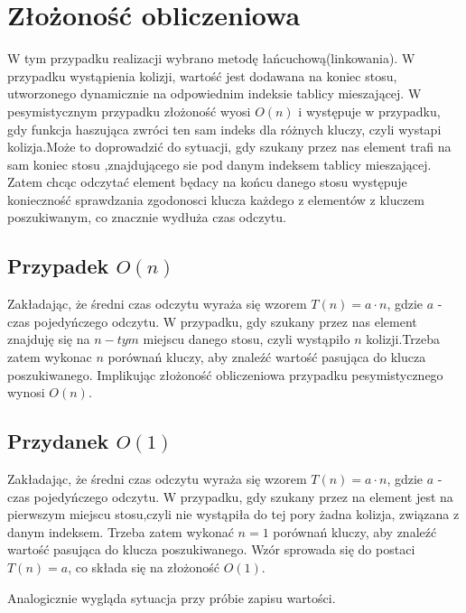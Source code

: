 \documentclass[12pt,a4paper,titlepage]{article}
\begin{document}
\section{Złożoność obliczeniowa}
W tym przypadku realizacji wybrano metodę łańcuchową(linkowania).
W przypadku wystąpienia kolizji, wartość jest dodawana na koniec stosu, utworzonego dynamicznie na odpowiednim indeksie tablicy mieszającej.
W pesymistycznym przypadku złożoność wyosi $O(n)$ i występuje w przypadku, gdy funkcja haszująca zwróci ten sam indeks dla różnych kluczy, czyli wystapi kolizja.Może to doprowadzić do sytuacji, gdy szukany przez nas element trafi na sam koniec stosu ,znajdującego sie pod danym indeksem tablicy mieszającej.
Zatem chcąc odczytać element będacy na końcu danego stosu występuje konieczność sprawdzania zgodonosci klucza każdego z elementów z kluczem poszukiwanym, co znacznie wydłuża czas odczytu.
\subsection{Przypadek $O(n)$} 
Zakładając, że średni czas odczytu wyraża się wzorem $T(n) = a\cdot n$,\newline
gdzie $a$ - czas pojedyńczego odczytu.\newline
W przypadku, gdy szukany przez nas element znajduję się na $n-tym$ miejscu danego stosu, czyli wystąpiło $n$ kolizji.\newline Trzeba zatem wykonac $n$ porównań kluczy, aby znaleźć wartość pasująca do klucza poszukiwanego.\newline
Implikując złożoność obliczeniowa przypadku pesymistycznego wynosi $O(n)$.
\subsection{Przydanek $O(1)$} 
Zakładając, że średni czas odczytu wyraża się wzorem $T(n) = a\cdot n$,\newline
gdzie $a$ - czas pojedyńczego odczytu.\newline
W przypadku, gdy szukany przez na element jest na pierwszym miejscu stosu,czyli nie wystąpiła do tej pory żadna kolizja, związana z danym indeksem.\newline
Trzeba zatem wykonać $n=1$ porównań kluczy, aby znaleźć wartość pasująca do klucza poszukiwanego.\newline
Wzór sprowada się do postaci $T(n) = a$, co składa się na złożoność $O(1)$.

Analogicznie wygląda sytuacja przy próbie zapisu wartości.
\end{document}
